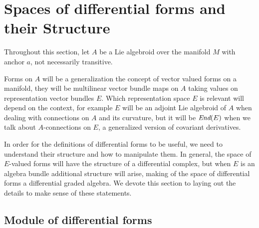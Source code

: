 \section{Spaces of differential forms and their Structure}

Throughout this section, let $A$ be a Lie algebroid over the manifold $M$ with anchor $a$, not necessarily transitive.

Forms on $A$ will be a generalization the concept of vector valued forms on a manifold, they will be multilinear vector bundle maps on $A$ taking values on representation vector bundles $E$. Which representation space $E$ is relevant will depend on the context, for example $E$ will be an adjoint Lie algebroid of $A$ when dealing with connections on $A$ and its curvature, but it will be $\operatorname{\textit{End}}(E)$ when we talk about $A$-connections on $E$, a generalized version of covariant derivatives.

In order for the definitions of differential forms to be useful, we need to understand their structure and how to manipulate them. In general, the space of $E$-valued forms will have the structure of a differential complex, but when $E$ is an algebra bundle additional structure will arise, making of the space of differential forms a differential graded algebra. We devote this section to laying out the details to make sense of these statements.

\subsection{Module of differential forms}

